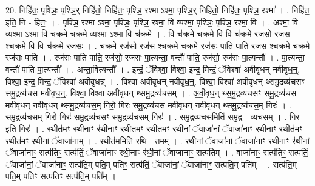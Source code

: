 \documentclass[17pt]{extarticle}
\begin{document}
20. निहि॑तः॒ पृश्ञिः॒ पृश्ञि॒र् निहि॑तो॒ निहि॑तः॒ पृश्ञि॒ रश्मा ऽश्मा॒ पृश्ञि॒र् निहि॑तो॒ निहि॑तः॒ पृश्ञि॒ रश्मा᳚ । . निहि॑त॒ इति॒ नि - हि॒तः॒ । . पृश्ञि॒ रश्मा ऽश्मा॒ पृश्ञिः॒ पृश्ञि॒ रश्मा॒ वि व्यश्मा॒ पृश्ञिः॒ पृश्ञि॒ रश्मा॒ वि । . अश्मा॒ वि व्यश्मा ऽश्मा॒ वि च॑क्रमे चक्रमे॒ व्यश्मा ऽश्मा॒ वि च॑क्रमे । . वि च॑क्रमे चक्रमे॒ वि वि च॑क्रमे॒ रज॑सो॒ रज॑स श्चक्रमे॒ वि वि च॑क्रमे॒ रज॑सः । . च॒क्र॒मे॒ रज॑सो॒ रज॑स श्चक्रमे चक्रमे॒ रज॑सः पाति पाति॒ रज॑स श्चक्रमे चक्रमे॒ रज॑सः पाति । . रज॑सः पाति पाति॒ रज॑सो॒ रज॑सः पा॒त्यन्ता॒ वन्तौ॑ पाति॒ रज॑सो॒ रज॑सः पा॒त्यन्तौ᳚ । . पा॒त्यन्ता॒ वन्तौ॑ पाति पा॒त्यन्तौ᳚ । . अन्ता॒वित्यन्तौ᳚ । . इन्द्रं॒ ॅविश्वा॒ विश्वा॒ इन्द्र॒ मिन्द्रं॒ ॅविश्वा॑ अवीवृधन् नवीवृध॒न्॒. विश्वा॒ इन्द्र॒ मिन्द्रं॒ ॅविश्वा॑ अवीवृधन्न् । . विश्वा॑ अवीवृधन् नवीवृध॒न्॒. विश्वा॒ विश्वा॑ अवीवृधन् थ्समु॒द्रव्य॑चसꣳ समु॒द्रव्य॑चस मवीवृध॒न्॒. विश्वा॒ विश्वा॑ अवीवृधन् थ्समु॒द्रव्य॑चसम् । . अ॒वी॒वृ॒ध॒न् थ्स॒मु॒द्रव्य॑चसꣳ समु॒द्रव्य॑चस मवीवृधन् नवीवृधन् थ्समु॒द्रव्य॑चस॒म् गिरो॒ गिरः॑ समु॒द्रव्य॑चस मवीवृधन् नवीवृधन् थ्समु॒द्रव्य॑चस॒म् गिरः॑ । . स॒मु॒द्रव्य॑चस॒म् गिरो॒ गिरः॑ समु॒द्रव्य॑चसꣳ समु॒द्रव्य॑चस॒म् गिरः॑ । . स॒मु॒द्रव्य॑चस॒मिति॑ समु॒द्र - व्य॒च॒स॒म् । . गिर॒ इति॒ गिरः॑ । . र॒थीत॑मꣳ रथी॒नाꣳ र॑थी॒नाꣳ र॒थीत॑मꣳ र॒थीत॑मꣳ रथी॒नां ॅवाजा॑नां॒ ॅवाजा॑नाꣳ रथी॒नाꣳ र॒थीत॑मꣳ र॒थीत॑मꣳ रथी॒नां ॅवाजा॑नाम् । . र॒थीत॑म॒मिति॑ र॒थि - त॒म॒म् । . र॒थी॒नां ॅवाजा॑नां॒ ॅवाजा॑नाꣳ रथी॒नाꣳ र॑थी॒नां ॅवाजा॑नाꣳ॒॒ सत्प॑तिꣳ॒॒ सत्प॑तिं॒ ॅवाजा॑नाꣳ रथी॒नाꣳ र॑थी॒नां ॅवाजा॑नाꣳ॒॒ सत्प॑तिम् । . वाजा॑नाꣳ॒॒ सत्प॑तिꣳ॒॒ सत्प॑तिं॒ ॅवाजा॑नां॒ ॅवाजा॑नाꣳ॒॒ सत्प॑ति॒म् पति॒म् पतिꣳ॒॒ सत्प॑तिं॒ ॅवाजा॑नां॒ ॅवाजा॑नाꣳ॒॒ सत्प॑ति॒म् पति᳚म् । . सत्प॑ति॒म् पति॒म् पतिꣳ॒॒ सत्प॑तिꣳ॒॒ सत्प॑ति॒म् पति᳚म् । \newline
\end{document}
